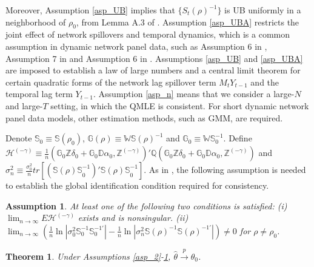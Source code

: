 \documentclass[11pt,a4paper]{article}
\newtheorem{theorem}{Theorem}
\newtheorem{assumption}{Assumption}
\begin{document}
Moreover, Assumption \ref{asp_UB} implies that $\{S_{t}(\rho)^{-1}\}$ is UB uniformly in a neighborhood of $\rho_0$, from Lemma A.3 of \cite{https://doi.org/10.1111/j.1468-0262.2004.00558.x}.
Assumption \ref{asp_UBA} restricts the joint effect of network spillovers and temporal dynamics, which is a common assumption in dynamic network panel data, such as Assumption 6 in \cite{YU2008118}, Assumption 7 in \cite{LEE2014174} and Assumption 6 in \cite{lee_qml_2012}. 
Assumptions \ref{asp_UB} and \ref{asp_UBA} are imposed to establish a law of large numbers and a central limit theorem for certain quadratic forms of the network lag spillover term $M_tY_{t-1}$ and the temporal lag term $Y_{t-1}$.
Assumption \ref{asp_n} means that we consider a large-$N$ and large-$T$ setting, in which the QMLE is consistent. For short dynamic network panel data models, other estimation methods, such as GMM, are required.

Denote $\mathbb{S}_0\equiv\mathbb{S}(\rho_0)$, $\mathbb{G}(\rho)\equiv\mathbb{WS}(\rho)^{-1}$ and $\mathbb{G}_0\equiv\mathbb{WS}^{-1}_0$. Define $\mathcal{H}^{(-\gamma)}\equiv\frac{1}{n}(\mathbb{G}_0\mathbb{Z}\delta_0+\mathbb{G}_0\mathbb{D}\alpha_0,\mathbb{Z}^{(-\gamma)})'\mathbb{Q}(\mathbb{G}_0\mathbb{Z}\delta_0+\mathbb{G}_0\mathbb{D}\alpha_0,\mathbb{Z}^{(-\gamma)})$ and  $\sigma_n^2\equiv\allowbreak\frac{\sigma^2_0}{n}tr[(\mathbb{S(\rho)S}_0^{-1})'\mathbb{S(\rho)S}_0^{-1}]$. As in \cite{YU2008118}, the following assumption is needed to establish the global identification condition required for consistency.
\begin{assumption}\label{asp_EH}%
At least one of the following two conditions is satisfied: (i) $\lim_{n\rightarrow\infty}E\mathcal{H}^{(-\gamma)}$ exists and is nonsingular.
(ii) $\lim_{n\rightarrow\infty}\left(\frac{1}{n}\ln|\sigma_0^2\mathbb{S}_0^{-1}\mathbb{S}_0^{-1\prime}|-\frac{1}{n}\ln|\sigma_n^2\mathbb{S}(\rho)^{-1}\mathbb{S}(\rho)^{-1\prime}|\right)\neq0$ for $\rho\neq\rho_0$.
\end{assumption}

\begin{theorem}\label{consistency}
Under Assumptions \ref{asp_2}-\ref{asp_EH}, $\hat{\theta}\stackrel{p}{\rightarrow}\theta_0$.
\end{theorem}
\end{document}
